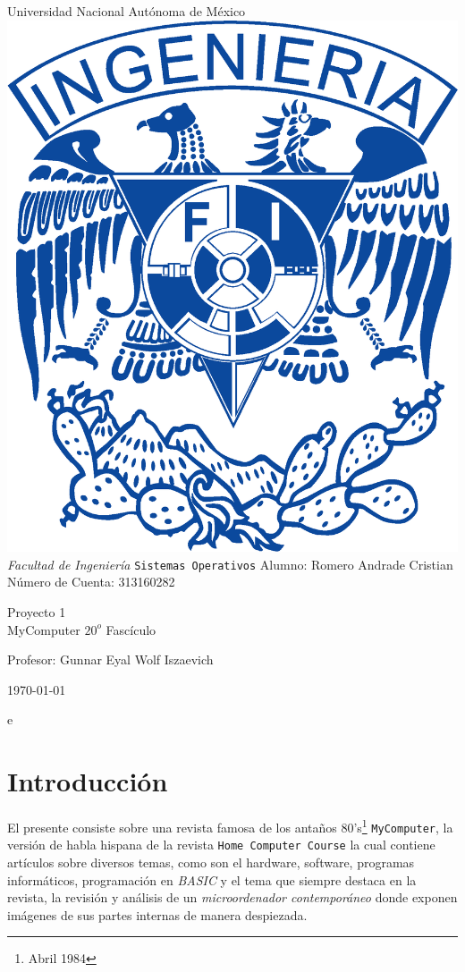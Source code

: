 \documentclass{article}
\begin{document}
\begin{titlepage}
  \begin{center}
    \Huge{Universidad Nacional Autónoma de México}
    \vfill
    \includegraphics[width=0.2\linewidth]{img/UNAM_INGENIERIA}
    \vfill
    \LARGE{\emph{Facultad de Ingeniería}}
    \vfill
    \LARGE{\texttt{Sistemas Operativos}}
    \vfill
    \Large{Alumno: Romero Andrade Cristian\\Número de Cuenta: 313160282} 
    
    \vfill
    
    \huge{Proyecto 1\\MyComputer $20^o$ Fascículo}
    \vfill
    
    
    \large{Profesor: Gunnar Eyal Wolf Iszaevich}

    \vfill

    {\large \today\par}
    \newpage
  \end{center}
\end{titlepage}


e
\section{Introducción}\label{sec:introduction}

El presente consiste sobre una revista famosa de los antaños 80's\footnote{Abril 1984} \texttt{MyComputer},
la versión de habla hispana de la revista \texttt{Home Computer Course} la cual contiene artículos sobre
diversos temas, como son el hardware, software, programas informáticos, programación en \textit{BASIC} y el
tema que siempre destaca en la revista, la revisión y análisis de un \textit{microordenador contemporáneo} donde
exponen imágenes de sus partes internas de manera despiezada.
\end{document}
